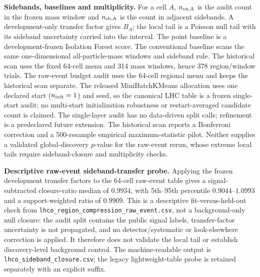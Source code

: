 \documentclass[11pt,a4paper]{article}
\numberwithin{equation}{section}
\theoremstyle{definition}\newtheorem{definition}[theorem]{Definition}
\theoremstyle{remark}\newtheorem{remark}[theorem]{Remark}
\begin{document}
\textbf{Sidebands, baselines and multiplicity.} For a cell $A$, $n_{\rm on,A}$ is the audit count in the frozen mass window and $n_{\rm sb,A}$ is the count in adjacent sidebands. A development-only transfer factor gives $B_A$; the local tail is a Poisson null tail with its sideband uncertainty carried into the interval. The point baseline is a development-frozen Isolation Forest score. The conventional baseline scans the same one-dimensional all-particle-mass windows and sideband rule. The historical scan uses the fixed 64-cell menu and 314 mass windows, hence 378 region/window trials. The raw-event budget audit uses the 64-cell regional menu and keeps the historical scan separate. The released MiniBatchKMeans allocation uses one declared start ($n_{\rm init}=1$) and seed, so the canonical LHC table is a frozen single-start audit; no multi-start initialization robustness or restart-averaged candidate count is claimed. The single-layer audit has no data-driven split calls; refinement is a predeclared future extension. The historical scan reports a Bonferroni correction and a 500-resample empirical maximum-statistic pilot. Neither supplies a validated global-discovery $p$-value for the raw-event rerun, whose extreme local tails require sideband-closure and multiplicity checks.

\textbf{Descriptive raw-event sideband-transfer probe.} Applying the frozen development transfer factors to the 64-cell raw-event table gives a signal-subtracted closure-ratio median of $0.9934$, with 5th--95th percentile $0.9044$--$1.0993$ and a support-weighted ratio of $0.9909$. This is a descriptive fit-versus-held-out check from \texttt{lhco\_region\_compression\_raw\_event.csv}, not a background-only null closure: the audit split contains the public signal labels, transfer-factor uncertainty is not propagated, and no detector/systematic or look-elsewhere correction is applied. It therefore does not validate the local tail or establish discovery-level background control. The machine-readable output is \texttt{lhco\_sideband\_closure.csv}; the legacy lightweight-table probe is retained separately with an explicit suffix.
\end{document}
